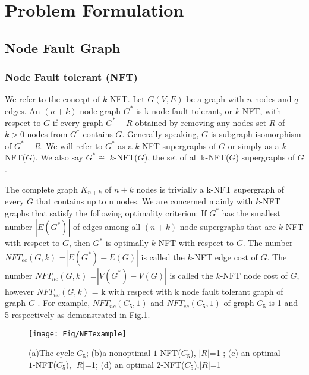 
\section{Problem Formulation}
\label{sec:ProblemFormulation}


\subsection{Node Fault Graph}
\subsubsection{Node Fault tolerant (NFT)}
We refer to the concept of $k$-NFT\cite{harary1996node}. Let $G(V,E)$ be a graph with $n$ nodes and $q$ edges. An $(n+k)$-node graph $G^*$ is k-node fault-tolerant, or $k$-NFT, with respect to $G$ if every graph $G^*-R$ obtained by removing any nodes set $R$ of $k>0$ nodes from $G^*$ contains $G$. Generally speaking, $G$ is subgraph isomorphism of $G^*-R$. We will refer to $G^*$ as a $k$-NFT supergraphs of $G$ or simply as a $k$-NFT($G$). We also say $G^*\cong$ $k$-NFT($G$), the set of all k-NFT($G$) supergraphs of $G$.

The complete graph $K_{n+k}$ of $n + k$ nodes is trivially a k-NFT supergraph of every $G$ that contains up to n nodes. We are concerned mainly with $k$-NFT graphs that satisfy the following optimality criterion: If $G^*$ has the smallest number $|E(G^*)|$ of edges among all $(n + k)$-node supergraphs that are $k$-NFT with respect to $G$, then $G^*$ is optimally $k$-NFT with respect to $G$. The number $NFT_{ec}$$(G,k)$ =$|E(G^*)-E(G)|$ is called the $k$-NFT edge cost of $G$. The number $NFT_{nc}$$(G,k)$ =$|V(G^*)-V(G)|$ is called the $k$-NFT node cost of $G$, however $NFT_{nc}$$(G,k)$ = k with respect with k node fault tolerant graph of graph $G$ . For example, $NFT_{nc}$$(C_5,1)$ and $NFT_{ec}$$(C_5,1)$ of graph $C_5$ is 1 and 5 respectively as demonstrated in Fig.\ref{fig:NFTexample}.

\begin{figure}
  \centering
  \texttt{[image: Fig/NFTexample]}\\
  \caption{(a)The cycle $C_5$; (b)a nonoptimal $1$-NFT($C_5$), $|R|$=1 ; (c) an optimal $1$-NFT($C_5$), $|R|$=1; (d) an optimal $2$-NFT($C_5$),$|R|$=1 }\label{fig:NFTexample}
\end{figure}

